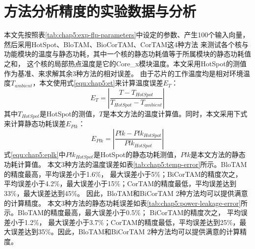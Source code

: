 \section{方法分析精度的实验数据与分析}
本文先按照表\ref{tab:chap5:exp-flp-parameters}中设定的参数、产生100个输入向量， 然后采用HotSpot、BloTAM、BioCorTAM、CorTAM这4种方法 来测试各个核与功能模块的温度与静态功耗，其中一个核的静态功耗值等于所属模块的静态功耗值之和， 这个核的局部热点温度是它的Core\_x模块温度。本文采用HotSpot的测值作为基准、来求解其余3种方法的相对误差。 由于芯片的工作温度均是相对环境温度$T_{ambient}$，本文使用式\ref{equ:chap5:et}来计算温度误差$E_T$：
\begin{equation}
\label{equ:chap5:et}
E_T = |\frac{T-T_{HotSpot}}{T_{HotSpot}-T_{ambient}}|
\end{equation}
其中$T_{HotSpot}$是HotSpot的测值，$T$是本文方法的温度计算值。同时，本文采用下式来计算静态功耗误差$E_{Plk}$：
\begin{equation}
\label{equ:chap5:eplk}
E_{Plk} = |\frac{Plk-Plk_{HotSpot}}{Plk_{HotSpot}}|
\end{equation}
式\ref{equ:chap5:eplk}中$Plk_{HotSpot}$是HotSpot的静态功耗测值，$Plk$是本文方法的静态功耗计算值。
本文3种方法的温度误差如表\ref{tab:chap5:temp-error}所示。BloTAM的精度最高，平均误差小于1.6\%， 最大误差小于5\%；BiCorTAM的精度次之， 平均误差小于4.2\%，最大误差小于15\%；CorTAM的精度最低，平均误差达到33\%，最大误差达到45\%。 因此，BloTAM和BiCorTAM 2种方法均可以提供满意的计算精度。
本文3种方法的静态功耗误差如表\ref{tab:chap5:power-leakage-error}所示。BloTAM的精度最高，最大误差小于0.5\%； BiCorTAM的精度次之， 平均误差小于1.2\%， 最大误差小于3.7\%；CorTAM的精度最低，平均误差达到25\%，最大误差达到35\%。因此，BloTAM和BiCorTAM 2种方法均可以提供满意的计算精度。
